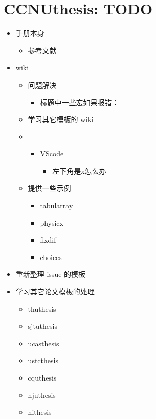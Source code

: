 \documentclass{ccnudoc}
\begin{document}
\section{CCNUthesis: TODO}

\begin{itemize}
  \item 手册本身
    \begin{itemize}
      \item 参考文献
    \end{itemize}
  \item wiki
    \begin{itemize}
      \item 问题解决
        \begin{itemize}
          \item 标题中一些宏如果报错：
        \end{itemize}
      \item 学习其它模板的 wiki
      \item 
        \begin{itemize}
          \item VScode
            \begin{itemize}
              \item 左下角是x怎么办
            \end{itemize}
        \end{itemize}
      \item 提供一些示例
        \begin{itemize}
          \item tabularray
          \item physicx
          \item fixdif
          \item choices
        \end{itemize}
    \end{itemize}
  \item 重新整理 issue 的模板
  \item 学习其它论文模板的处理
    \begin{itemize}
      \item thuthesis
      \item sjtuthesis
      \item ucasthesis
      \item ustcthesis
      \item cquthesis
      \item njuthesis
      \item hithesis
    \end{itemize}
\end{itemize}

\printbibliography
\end{document}
